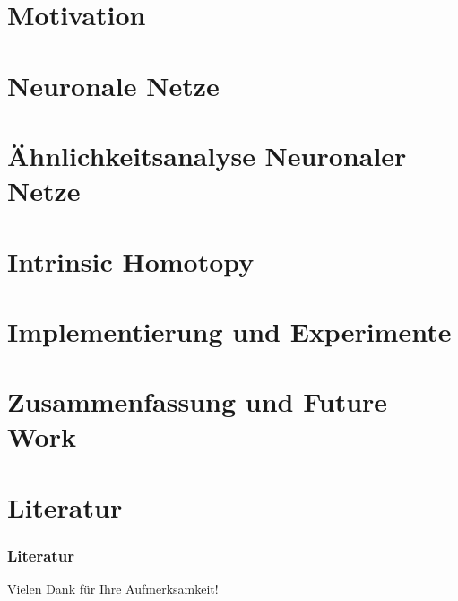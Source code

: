\documentclass[aspectratio=169,16pt]{beamer}
\begin{document}
\section{Motivation}
\frame{\tableofcontents[currentsection]}

\section{Neuronale Netze}
\frame{\tableofcontents[currentsection]}

\section{Ähnlichkeitsanalyse Neuronaler Netze}
\frame{\tableofcontents[currentsection]}

\section{Intrinsic Homotopy}
\frame{\tableofcontents[currentsection]}

\section{Implementierung und Experimente}
\frame{\tableofcontents[currentsection]}

\section{Zusammenfassung und Future Work}




\appendix\nocite{*}
\section{Literatur}
\begin{frame}
	\frametitle{Literatur}
	

\end{frame}

\begin{frame}[nosection]
    Vielen Dank für Ihre Aufmerksamkeit!
\end{frame}
\end{document}
